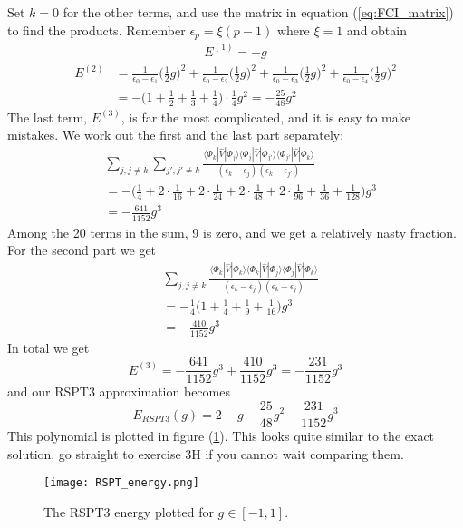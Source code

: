 \documentclass[norsk,a4paper,12pt]{article}
\begin{document}
Set $k=0$ for the other terms, and use the matrix in equation (\ref{eq:FCI_matrix}) to find the products. Remember $\epsilon_p=\xi(p-1)$ where $\xi=1$ and obtain
\begin{align*}
E^{(1)}=-g
\end{align*}
\begin{align*}
E^{(2)}&=\frac{1}{\epsilon_0-\epsilon_1}\Big(\frac{1}{2}g\Big)^2+\frac{1}{\epsilon_0-\epsilon_2}\Big(\frac{1}{2}g\Big)^2+\frac{1}{\epsilon_0-\epsilon_3}\Big(\frac{1}{2}g\Big)^2+\frac{1}{\epsilon_0-\epsilon_4}\Big(\frac{1}{2}g\Big)^2\\
&=-\Big(1+\frac{1}{2}+\frac{1}{3}+\frac{1}{4}\Big)\cdot\frac{1}{4}g^2=-\frac{25}{48}g^2
\end{align*}
The last term, $E^{(3)}$, is far the most complicated, and it is easy to make mistakes. We work out the first and the last part separately:
\begin{align*}
&\sum_{j,j\neq k}\sum_{j',j'\neq k}\frac{\langle\Phi_k|\hat{V}|\Phi_j\rangle\langle\Phi_j|\hat{V}|\Phi_{j'}\rangle\langle\Phi_{j'}|\hat{V}|\Phi_k\rangle}{(\epsilon_k-\epsilon_j)(\epsilon_k-\epsilon_{j'})}\\
&=-\Big(\frac{1}{4}+2\cdot\frac{1}{16}+2\cdot\frac{1}{24}+2\cdot\frac{1}{48}+2\cdot\frac{1}{96}+\frac{1}{36}+\frac{1}{128}\Big)g^3\\
&=-\frac{641}{1152}g^3
\end{align*}
Among the 20 terms in the sum, 9 is zero, and we get a relatively nasty fraction. For the second part we get
\begin{align*}
&\sum_{j,j\neq k}\frac{\langle\Phi_k|\hat{V}|\Phi_k\rangle\langle\Phi_k|\hat{V}|\Phi_{j}\rangle\langle\Phi_j|\hat{V}|\Phi_k\rangle}{(\epsilon_k-\epsilon_j)(\epsilon_k-\epsilon_j)}\\
&=-\frac{1}{4}\Big(1+\frac{1}{4}+\frac{1}{9}+\frac{1}{16}\Big)g^3\\
&=-\frac{410}{1152}g^3
\end{align*}
In total we get 
\begin{equation*}
E^{(3)}=-\frac{641}{1152}g^3+\frac{410}{1152}g^3=-\frac{231}{1152}g^3
\end{equation*}
and our RSPT3 approximation becomes
\begin{equation}
E_{RSPT3}(g)=2-g-\frac{25}{48}g^2 - \frac{231}{1152}g^3
\end{equation}
This polynomial is plotted in figure (\ref{fig:RSPT_energy}). This looks quite similar to the exact solution, go straight to exercise 3H if you cannot wait comparing them.
\begin{figure}[H]
\centering
\texttt{[image: RSPT\_energy.png]}
\caption{The RSPT3 energy plotted for $g\in[-1, 1]$. \label{fig:RSPT_energy}}
\end{figure}
\end{document}
